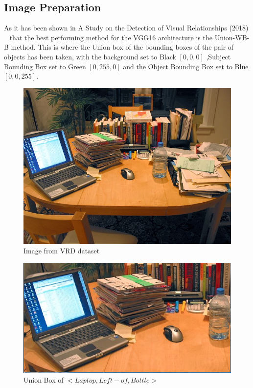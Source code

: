 \documentclass{csfyp}
\begin{document}
\subsection{Image Preparation}
As it has been shown in A Study on the Detection of Visual Relationships (2018) ~\cite{detectionRelationships} that the best performing method for the VGG16 architecture is the Union-WB-B method. This is where the Union box of the bounding boxes of the pair of objects has been taken, with the background set to Black $[0,0,0]$ ,Subject Bounding Box set to Green $[0,255,0]$ and the Object Bounding Box set to Blue $[0,0,255]$.

\begin{figure}[!htbp]
\centering
\includegraphics[scale=0.25]{originalImage.pdf}
\caption{Image from VRD dataset}
\end{figure}

\begin{figure}[!htbp]
\centering
\includegraphics[scale=0.35]{UnionBox.pdf}
\caption{Union Box of $<Laptop, Left-of , Bottle>$}
\end{figure}
\end{document}
